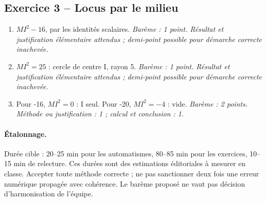 \subsection*{Exercice 3 -- Locus par le milieu}
\begin{enumerate}
\item $MI^2-16$, par les identités scalaires. \textit{Barème : 1 point. Résultat et justification élémentaire attendus ; demi-point possible pour démarche correcte inachevée.}
\item $MI^2=25$ : cercle de centre I, rayon 5. \textit{Barème : 1 point. Résultat et justification élémentaire attendus ; demi-point possible pour démarche correcte inachevée.}
\item Pour -16, $MI^2=0$ : I seul. Pour -20, $MI^2=-4$ : vide. \textit{Barème : 2 points. Méthode ou justification : 1 ; calcul et conclusion : 1.}
\end{enumerate}
\paragraph{Étalonnage.} Durée cible : 20–25 min pour les automatismes, 80–85 min pour les exercices, 10–15 min de relecture. Ces durées sont des estimations éditoriales à mesurer en classe. Accepter toute méthode correcte ; ne pas sanctionner deux fois une erreur numérique propagée avec cohérence. Le barème proposé ne vaut pas décision d’harmonisation de l’équipe.
